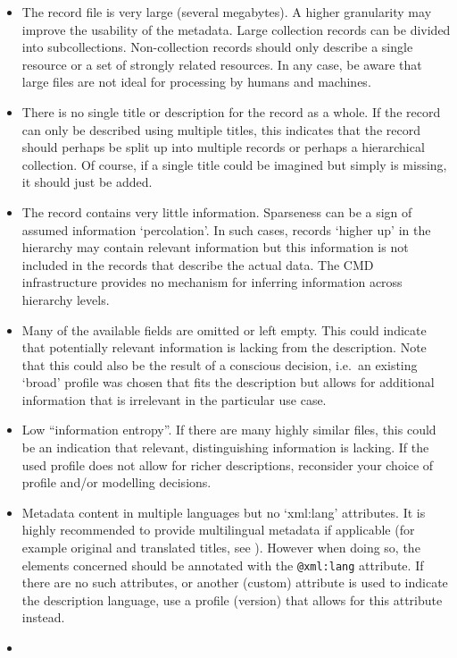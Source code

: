 \begin{itemize}
\tightlist
\item
  The record file is very large (several megabytes). A higher
  granularity may improve the usability of the metadata. Large
  collection records can be divided into subcollections. Non-collection records should only describe a single resource or a set of strongly related resources. In any case, be aware that large files are not ideal for processing by humans and machines.
\item
  There is no single title or description for the record as a whole. If the record can only be described using multiple titles, this indicates that the record should perhaps be split up into multiple records or perhaps a hierarchical collection. Of course, if a single title could be imagined but simply is missing, it should just be added.
\item
  The record contains very little information. Sparseness can be a sign of assumed information `percolation'. In such cases, records `higher up' in the hierarchy may contain relevant information but this information is not included in the records that describe the actual data. The CMD infrastructure provides no mechanism for inferring information across hierarchy levels.
\item
  Many of the available fields are omitted or left empty. This could indicate that potentially relevant information is lacking from the description. Note that this could also be the result of a conscious decision, i.e.~an existing `broad' profile was chosen that fits the description but allows for additional information that is irrelevant in the particular use case.
\item
  Low ``information entropy''. If there are many highly similar files, this could be an indication that relevant, distinguishing information is lacking. If the used profile does not allow for richer descriptions, reconsider your choice of profile and/or modelling decisions.
\item
  Metadata content in multiple languages but no `xml:lang' attributes. It is highly recommended to provide multilingual metadata if applicable (for example original and translated titles, see ). However when doing so, the elements concerned should be annotated with the \texttt{@xml:lang} attribute. If there are no such attributes, or another (custom) attribute is used to indicate the description language, use a profile (version) that allows for this attribute instead.
\item

\end{itemize}
